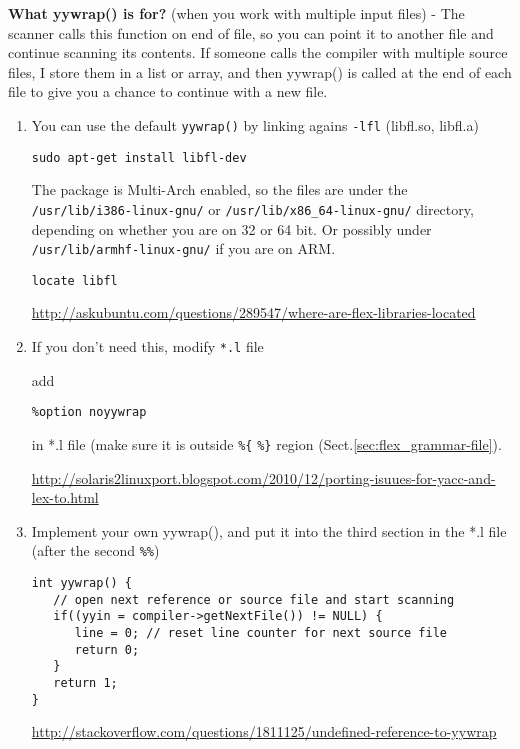 {\bf What yywrap() is for?} (when you work with multiple input files) - The
scanner calls this function on end of file, so you can point it to another file
and continue scanning its contents. If someone calls the compiler with multiple
source files, I store them in a list or array, and then yywrap() is called at
the end of each file to give you a chance to continue with a new file.

\begin{enumerate}
  \item You can use the default \verb!yywrap()! by linking agains \verb!-lfl!
(libfl.so, libfl.a)
\begin{verbatim}
sudo apt-get install libfl-dev
\end{verbatim}

The package is Multi-Arch enabled, so the files are under the
\verb!/usr/lib/i386-linux-gnu/! or \verb!/usr/lib/x86_64-linux-gnu/! directory,
depending on whether you are on 32 or 64 bit. Or possibly under
\verb!/usr/lib/armhf-linux-gnu/! if you are on ARM.
\begin{verbatim}
locate libfl
\end{verbatim}
\url{http://askubuntu.com/questions/289547/where-are-flex-libraries-located}

  \item  If you don't need this, modify \verb!*.l! file
  
add
\begin{verbatim}
%option noyywrap
\end{verbatim}
in *.l file (make sure it is outside \verb!%{! \verb!%}! region
(Sect.\ref{sec:flex_grammar-file}).

\url{http://solaris2linuxport.blogspot.com/2010/12/porting-isuues-for-yacc-and-lex-to.html}

  \item Implement your own yywrap(), and put it into the third section
  in the *.l file (after the second \verb!%%!)
  
\begin{lstlisting}
int yywrap() {
   // open next reference or source file and start scanning
   if((yyin = compiler->getNextFile()) != NULL) {
      line = 0; // reset line counter for next source file
      return 0;
   }
   return 1;
}
\end{lstlisting}
\url{http://stackoverflow.com/questions/1811125/undefined-reference-to-yywrap}

\end{enumerate}


